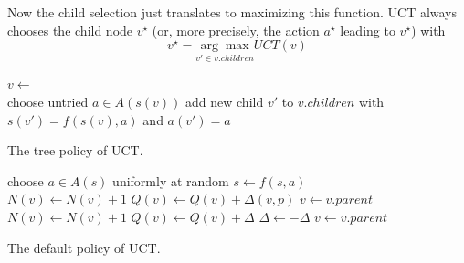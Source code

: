 Now the child selection just translates to maximizing this function. UCT always chooses the child node $v^\star$ (or, more precisely, the action $a^\star$ leading to $v^\star$) with
\begin{equation*}
    v^\star = \underset{v' \in v.children}{\arg \max} UCT(v)
\end{equation*}  
\begin{algorithm}[htbp]
\begin{algorithmic}
    \State {}
    \Else
    \State $v \gets$ 
    \EndIf
    \EndWhile
\EndFunction \\
\State choose untried $a \in A(s(v))$
\State add new child $v'$ to $v.children$ with $s(v') = f(s(v),a)$ and $a(v') = a$
\State {}
\EndFunction \\
\State {}
\EndFunction
\end{algorithmic}
\caption{The tree policy of UCT.}
\label{alg:uct_tree_policy}
\end{algorithm}
\begin{algorithm}[htbp]
\begin{algorithmic}
\State choose $a \in A(s)$ uniformly at random
\State $s \gets f(s,a)$
\EndWhile
\State {}
\EndFunction \\

 
\State $N(v) \gets N(v) + 1$
\State $Q(v) \gets Q(v) + \Delta(v,p)$
\State $v \gets v.parent$
\EndWhile
\State $N(v) \gets N(v) + 1$
\State $Q(v) \gets Q(v) + \Delta$
\State $\Delta \gets - \Delta$
\State $v \gets v.parent$
\EndFunction
\end{algorithmic}
\caption{The default policy of UCT.}
\label{alg:uct_default_policy}
\end{algorithm}
